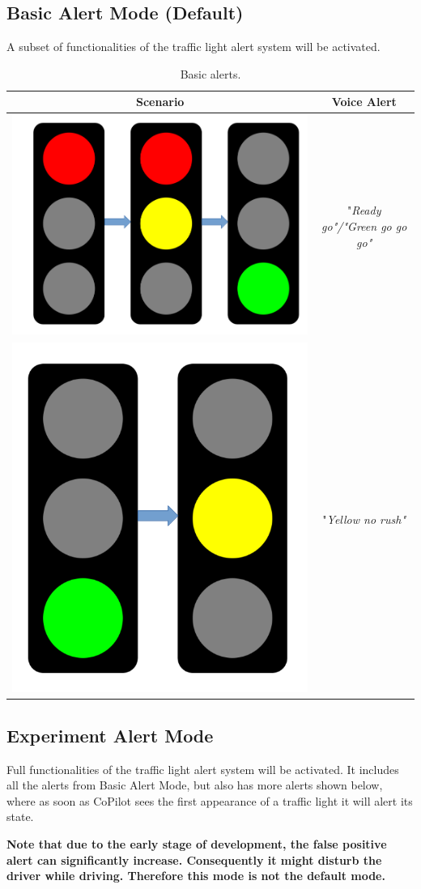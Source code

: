 \documentclass[a4paper]{manual}
\begin{document}
\newcommand{\centered}[1]{\begin{tabular}{l} #1 \end{tabular}}

\subsection{Basic Alert Mode (Default)}
A subset of functionalities of the traffic light alert system will be activated.
\begin{table}[ht]
\caption{Basic alerts.}
\centering
\begin{tabular}{c|c}
\hline
    Scenario & Voice Alert \\
\hline
    \includegraphics[height=0.15\textwidth]{pics/red_to_green.png} &  "\emph{Ready go"/"Green go go go"}  \\
\hline
     \includegraphics[height=0.15\textwidth]{pics/green_to_yellow.png} &  "\emph{Yellow no rush"} \\
\hline
\end{tabular}
\label{tab:gt}
\end{table}

\clearpage
\subsection{Experiment Alert Mode}
Full functionalities of the traffic light alert system will be activated. It includes all the alerts from Basic Alert Mode, but also has more alerts shown below, where as soon as CoPilot
sees the first appearance of a traffic light it will alert its state.

\textbf{Note that due to the early stage of development, the false positive alert can significantly increase. Consequently it might disturb the driver while driving. Therefore this mode is not the default mode.}
\end{document}
